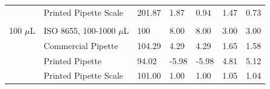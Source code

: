 \documentclass[10pt,letterpaper]{article}
\begin{document}
\begin{table}[!ht]
\begin{adjustwidth}{-2.25in}{0in}
\begin{tabular}{lllllll}
        & Printed Pipette Scale & 201.87  & 1.87             & 0.94         & 1.47         & 0.73          \\
        &                       &         &                  &              &              &               \\
100 $\mu$L  & ISO 8655, 100-1000 $\mu$L & 100     & 8.00             & 8.00         & 3.00         & 3.00          \\
        & Commercial Pipette    & 104.29  & 4.29             & 4.29         & 1.65         & 1.58          \\
        & Printed Pipette       & 94.02   & -5.98            & -5.98        & 4.81         & 5.12          \\
        & Printed Pipette Scale & 101.00  & 1.00             & 1.00         & 1.05         & 1.04         
\end{tabular}
\end{adjustwidth}
\end{table}
\end{document}
